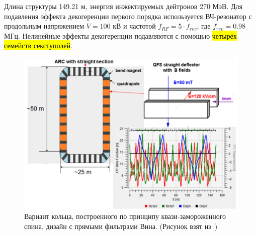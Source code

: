 Длина структуры 149.21 м, энергия инжектируемых дейтронов 270 МэВ. Для подавления эффекта декогеренции первого порядка используется ВЧ-резонатор с продольным напряжением $V = 100$ кВ и частотой $f_{RF} = 5\cdot f_{rev}$, где $f_{rev} = 0.98$ МГц. Нелинейные эффекты декогеренции подавляются с помощью \hl{четырёх семейств секступолей}.
\begin{figure}[h!]
	\centering
	\includegraphics[width=\linewidth]{images/chapter2/E+B_lattice}
	\caption{Вариант кольца, построенного по принципу квази-замороженного спина, дизайн с прямыми фильтрами Вина. (Рисунок взят из~\cite{Senichev:Lattices})\label{fig:QFS_E+B_lattice}}
\end{figure}

